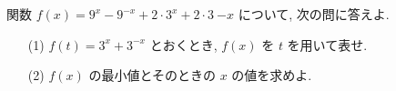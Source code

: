 \documentclass[8pt,dvipdfmx]{article}[b5paper]
\begin{document}
\begin{tcolorbox}[title=数学\textcircled{2} 1-5 AB]
関数 \( f(x) = 9^{x} -9^{- x} + 2\cdot3^{x}+ 2\cdot3~{-x} \) について, 次の問に答えよ.
\begin{enumerate}
    \item[(1)] \( f(t) = 3^{x}+3^{-x} \) とおくとき, \( f(x) \) を \( t \) を用いて表せ.
    \item[(2)] \( f(x) \) の最小値とそのときの \( x \) の値を求めよ.
\end{enumerate}
\end{tcolorbox}



\end{document}
